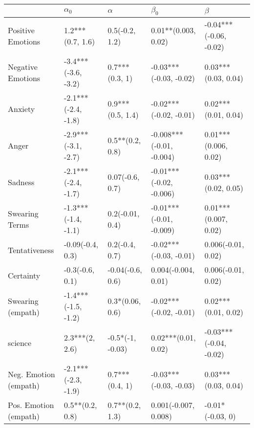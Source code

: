 \begin{tabular}{lllll}
\toprule
{} &           $\alpha_0$ &          $\alpha$ &                 $\beta_0$ &                 $\beta$ \\
\midrule
Positive Emotions     &     1.2***(0.7, 1.6) &    0.5(-0.2, 1.2) &       0.01**(0.003, 0.02) &  -0.04***(-0.06, -0.02) \\
Negative Emotions     &  -3.4***(-3.6, -3.2) &    0.7***(0.3, 1) &    -0.03***(-0.03, -0.02) &     0.03***(0.03, 0.04) \\
Anxiety               &  -2.1***(-2.4, -1.8) &  0.9***(0.5, 1.4) &    -0.02***(-0.02, -0.01) &     0.02***(0.01, 0.04) \\
Anger                 &  -2.9***(-3.1, -2.7) &   0.5**(0.2, 0.8) &  -0.008***(-0.01, -0.004) &    0.01***(0.006, 0.02) \\
Sadness               &  -2.1***(-2.4, -1.7) &   0.07(-0.6, 0.7) &   -0.01***(-0.02, -0.006) &     0.03***(0.02, 0.05) \\
Swearing Terms        &  -1.3***(-1.4, -1.1) &   0.2(-0.01, 0.4) &   -0.01***(-0.01, -0.009) &    0.01***(0.007, 0.02) \\
Tentativeness         &     -0.09(-0.4, 0.3) &    0.2(-0.4, 0.7) &    -0.02***(-0.03, -0.01) &      0.006(-0.01, 0.02) \\
Certainty             &      -0.3(-0.6, 0.1) &  -0.04(-0.6, 0.6) &       0.004(-0.004, 0.01) &      0.006(-0.01, 0.02) \\
Swearing (empath)     &  -1.4***(-1.5, -1.2) &   0.3*(0.06, 0.6) &    -0.02***(-0.02, -0.01) &     0.02***(0.01, 0.02) \\
science               &       2.3***(2, 2.6) &  -0.5*(-1, -0.03) &       0.02***(0.01, 0.02) &  -0.03***(-0.04, -0.02) \\
Neg. Emotion (empath) &  -2.1***(-2.3, -1.9) &    0.7***(0.4, 1) &    -0.03***(-0.03, -0.03) &     0.03***(0.03, 0.04) \\
Pos. Emotion (empath) &      0.5**(0.2, 0.8) &   0.7**(0.2, 1.3) &      0.001(-0.007, 0.008) &        -0.01*(-0.03, 0) \\
\bottomrule
\end{tabular}
